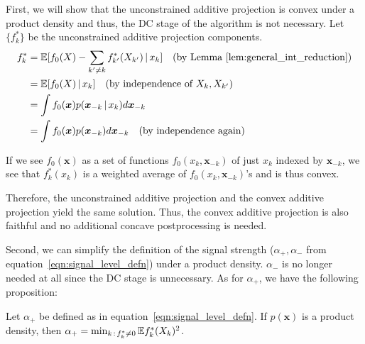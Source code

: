 \documentclass[12pt,pdftex,aos,noinfoline,addressasfootnote]{imsart}
\begin{document}
First, we will show that the unconstrained additive projection is convex under a product density and thus, the DC stage of the algorithm is not necessary. Let $\{ f^*_k \}$ be the unconstrained additive projection components.
\begin{align*}
 f^*_k &= {\mathbb E}[ f_0(X) - \sum_{k' \neq k} f^*_{k'}(X_{k'}) {\,|\,} x_k ] \quad 
\textrm{(by Lemma~\ref{lem:general_int_reduction})} \\
     &= {\mathbb E}[ f_0(X) {\,|\,} x_k ] \quad \textrm{(by independence of $X_k, X_{k'}$)} \\
  &= \int f_0(\mbox{\boldmath $x$}) p(\mbox{\boldmath $x$}_{-k} {\,|\,} x_k ) d \mbox{\boldmath $x$}_{-k} \\
  &= \int f_0(\mbox{\boldmath $x$}) p(\mbox{\boldmath $x$}_{-k}) d\mbox{\boldmath $x$}_{-k} \quad
   \textrm{(by independence again)}
\end{align*}

If we see $f_0(\mathbf{x})$ as a set of functions $f_0(x_k, \mathbf{x}_{-k})$ of just $x_k$ indexed by $\mathbf{x}_{-k}$, we see that $f^*_k(x_k)$ is a weighted average of $f_0(x_k, \mathbf{x}_{-k})$'s and is thus convex. 

Therefore, the unconstrained additive projection and the convex additive projection yield the same solution. Thus, the convex additive projection is also faithful and no additional concave postprocessing is needed.  

Second, we can simplify the definition of the signal strength ($\alpha_+, \alpha_-$ from equation~\ref{eqn:signal_level_defn}) under a product density. $\alpha_-$ is no longer needed at all since the DC stage is unnecessary. As for $\alpha_+$, we have the following proposition:

\begin{proposition}
Let $\alpha_+$ be defined as in equation~\ref{eqn:signal_level_defn}. If $p(\mathbf{x})$ is a product density, then $\alpha_+ = \min_{k \,:\, f^*_k \neq 0} {\mathbb E} f^*_k(X_k)^2$. 
\end{proposition}
\end{document}
